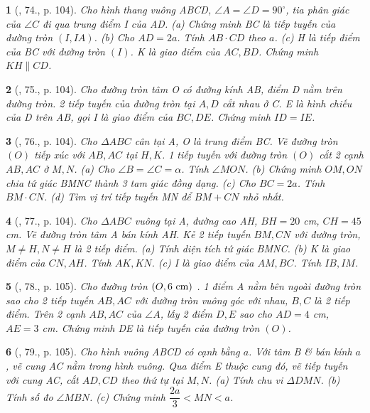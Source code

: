 \documentclass{article}
\newtheorem{baitoan}{}
\begin{document}
\begin{baitoan}[\cite{Binh_Toan_9_tap_1}, 74., p. 104]
	Cho hình thang vuông ABCD, $\angle{A} = \angle{D} = 90^\circ$, tia phân giác của $\angle{C}$ đi qua trung điểm I của AD. (a) Chứng minh BC là tiếp tuyến của đường tròn $(I,IA)$. (b) Cho $AD = 2a$. Tính $AB\cdot CD$ theo $a$. (c) H là tiếp điểm của BC với đường tròn $(I)$. K là giao điểm của $AC,BD$. Chứng minh $KH\parallel CD$.
\end{baitoan}

\begin{baitoan}[\cite{Binh_Toan_9_tap_1}, 75., p. 104]
	Cho đường tròn tâm O có đường kính AB, điểm D nằm trên đường tròn. 2 tiếp tuyến của đường tròn tại $A,D$ cắt nhau ở C. E là hình chiếu của D trên AB, gọi I là giao điểm của $BC,DE$. Chứng minh $ID = IE$.
\end{baitoan}

\begin{baitoan}[\cite{Binh_Toan_9_tap_1}, 76., p. 104]
	Cho $\Delta ABC$ cân tại A, O là trung điểm BC. Vẽ đường tròn $(O)$ tiếp xúc với $AB,AC$ tại $H,K$. 1 tiếp tuyến với đường tròn $(O)$ cắt 2 cạnh $AB,AC$ ở $M,N$. (a) Cho $\angle{B} = \angle{C} = \alpha$. Tính $\angle{MON}$. (b) Chứng minh $OM,ON$ chia tứ giác BMNC thành 3 tam giác đồng dạng. (c) Cho $BC = 2a$. Tính $BM\cdot CN$. (d) Tìm vị trí tiếp tuyến MN để $BM + CN$ nhỏ nhất.
\end{baitoan}

\begin{baitoan}[\cite{Binh_Toan_9_tap_1}, 77., p. 104]
	Cho $\Delta ABC$ vuông tại A, đường cao AH, $BH = 20$ {\rm cm}, $CH = 45$ {\rm cm}. Vẽ đường tròn tâm A bán kính AH. Kẻ 2 tiếp tuyến $BM,CN$ với đường tròn, $M\ne H,N\ne H$ là 2 tiếp điểm. (a) Tính diện tích tứ giác BMNC. (b) K là giao điểm của $CN,AH$. Tính $AK,KN$. (c) I là giao điểm của $AM,BC$. Tính $IB,IM$.
\end{baitoan}

\begin{baitoan}[\cite{Binh_Toan_9_tap_1}, 78., p. 105]
	Cho đường tròn $(O,6\ {\rm cm})$ . 1 điểm A nằm bên ngoài đường tròn sao cho 2 tiếp tuyến $AB,AC$ với đường tròn vuông góc với nhau, $B,C$ là 2 tiếp điểm. Trên 2 cạnh $AB,AC$ của $\angle{A}$, lấy 2 điểm $D,E$ sao cho $AD = 4$ {\rm cm}, $AE = 3$ {\rm cm}. Chứng minh DE là tiếp tuyến của đường tròn $(O)$.
\end{baitoan}

\begin{baitoan}[\cite{Binh_Toan_9_tap_1}, 79., p. 105]
	Cho hình vuông ABCD có cạnh bằng $a$. Với tâm B \& bán kính $a$, vẽ cung AC nằm trong hình vuông. Qua điểm E thuộc cung đó, vẽ tiếp tuyến với cung AC, cắt $AD,CD$ theo thứ tự tại $M,N$. (a) Tính chu vi $\Delta DMN$. (b) Tính số đo $\angle{MBN}$. (c) Chứng minh $\dfrac{2a}{3} < MN < a$.
\end{baitoan}
\end{document}
